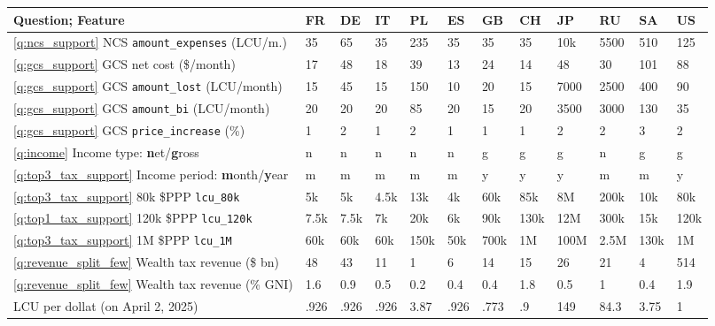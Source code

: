  \begin{tabular}{llllllllllll} \toprule  Question; Feature & FR & DE & IT & PL & ES & GB & CH & JP & RU & SA & US\\ \midrule \ref{q:ncs_support} NCS \verb|amount_expenses| (LCU/m.) & 35 & 65 & 35 & 235 & 35 & 35 & 35 & 10k & 5500 & 510 & 125\\ \ref{q:gcs_support} GCS net cost (\$/month) & 17 & 48 & 18 & 39 & 13 & 24 & 14 & 48 & 30 & 101 & 88\\ \ref{q:gcs_support} GCS \verb|amount_lost| (LCU/month) & 15 & 45 & 15 & 150 & 10 & 20 & 15 & 7000 & 2500 & 400 & 90\\ \ref{q:gcs_support} GCS \verb|amount_bi| (LCU/month) & 20 & 20 & 20 & 85 & 20 & 15 & 20 & 3500 & 3000 & 130 & 35\\ \ref{q:gcs_support} GCS \verb|price_increase| (\%) & 1~ & 2 & 1 & 2 & 1 & 1 & 1 & 2 & 2 & 3 & 2\\ \addlinespace \ref{q:income} Income type: \textbf{n}et/\textbf{g}ross & n & n & n & n & n & g & g & g & n & g & g\\ \ref{q:top3_tax_support} Income period: \textbf{m}onth/\textbf{y}ear & m & m & m & m & m & y & y & y & m & m & y\\ \ref{q:top3_tax_support} 80k \$PPP \verb|lcu_80k| & 5k & 5k & 4.5k & 13k & 4k & 60k & 85k & 8M & 200k & 10k & 80k\\ \ref{q:top1_tax_support} 120k \$PPP \verb|lcu_120k| & 7.5k & 7.5k & 7k & 20k & 6k & 90k & 130k & 12M & 300k & 15k & 120k\\ \ref{q:top3_tax_support} 1M \$PPP \verb|lcu_1M| & 60k & 60k & 60k & 150k & 50k & 700k & 1M & 100M & 2.5M & 130k & 1M\\ \addlinespace \ref{q:revenue_split_few} Wealth tax revenue (\$ bn) & 48 & 43 & 11 & 1 & 6 & 14 & 15 & 26 & 21 & 4 & 514\\ \ref{q:revenue_split_few} Wealth tax revenue (\% GNI) & 1.6 & 0.9 & 0.5 & 0.2 & 0.4 & 0.4 & 1.8 & 0.5 & 1 & 0.4 & 1.9\\ \quad LCU per dollat (on April 2, 2025) & .926 & .926 & .926 & 3.87 & .926 & .773 & .9 & 149 & 84.3 & 3.75 & 1\\ \bottomrule \end{tabular}